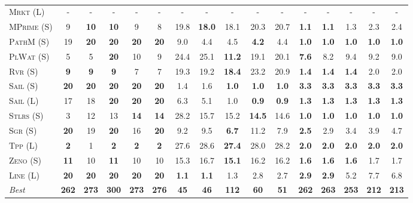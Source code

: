 \documentclass[11pt,landscape]{article}
\begin{document}
\begin{table*}[tb]
{\begin{tabular}{|l||ccccc||ccccc||ccccc||}
\textsc{Mrkt} (L)&-&-&-&-&-&-&-&-&-&-&-&-&-&-&-\\
\textsc{MPrime} (S)&9&\textbf{10}&\textbf{10}&9&8&19.8&\textbf{18.0}&18.1&20.3&20.7&\textbf{1.1}&\textbf{1.1}&1.3&2.3&2.4\\
\textsc{PathM} (S)&19&\textbf{20}&\textbf{20}&\textbf{20}&\textbf{20}&9.0&4.4&4.5&\textbf{4.2}&4.4&\textbf{1.0}&\textbf{1.0}&\textbf{1.0}&\textbf{1.0}&\textbf{1.0}\\
\textsc{PlWat} (S)&5&5&\textbf{20}&10&9&24.4&25.1&\textbf{11.2}&19.1&20.1&\textbf{7.6}&8.2&9.4&9.2&9.0\\
\textsc{Rvr} (S)&\textbf{9}&\textbf{9}&\textbf{9}&7&7&19.3&19.2&\textbf{18.4}&23.2&20.9&\textbf{1.4}&\textbf{1.4}&\textbf{1.4}&2.0&2.0\\
\textsc{Sail} (S)&\textbf{20}&\textbf{20}&\textbf{20}&\textbf{20}&\textbf{20}&1.4&1.6&\textbf{1.0}&\textbf{1.0}&\textbf{1.0}&\textbf{3.3}&\textbf{3.3}&\textbf{3.3}&\textbf{3.3}&\textbf{3.3}\\
\textsc{Sail} (L)&17&18&\textbf{20}&\textbf{20}&\textbf{20}&6.3&5.1&1.0&\textbf{0.9}&\textbf{0.9}&\textbf{1.3}&\textbf{1.3}&\textbf{1.3}&\textbf{1.3}&\textbf{1.3}\\
\textsc{Stlrs} (S)&3&12&13&\textbf{14}&\textbf{14}&28.2&15.7&15.2&\textbf{14.5}&14.6&\textbf{1.0}&\textbf{1.0}&\textbf{1.0}&\textbf{1.0}&\textbf{1.0}\\
\textsc{Sgr} (S)&\textbf{20}&19&\textbf{20}&16&\textbf{20}&9.2&9.5&\textbf{6.7}&11.2&7.9&\textbf{2.5}&2.9&3.4&3.9&4.7\\
\textsc{Tpp} (L)&\textbf{2}&1&\textbf{2}&\textbf{2}&\textbf{2}&27.6&28.6&\textbf{27.4}&28.0&28.2&\textbf{2.0}&\textbf{2.0}&\textbf{2.0}&\textbf{2.0}&\textbf{2.0}\\
\textsc{Zeno} (S)&\textbf{11}&10&\textbf{11}&10&10&15.3&16.7&\textbf{15.1}&16.2&16.2&\textbf{1.6}&\textbf{1.6}&\textbf{1.6}&1.7&1.7\\
\textsc{Line} (L)&\textbf{20}&\textbf{20}&\textbf{20}&\textbf{20}&\textbf{20}&\textbf{1.1}&\textbf{1.1}&1.3&2.8&2.7&\textbf{2.9}&\textbf{2.9}&5.2&7.7&6.8
\\\hline
\textit{Best}&\textbf{262}&\textbf{273}&\textbf{300}&\textbf{273}&\textbf{276}&\textbf{45}&\textbf{46}&\textbf{112}&\textbf{60}&\textbf{51}&\textbf{262}&\textbf{263}&\textbf{253}&\textbf{212}&\textbf{213}\\\hline

        \end{tabular}}
        \caption{}
        \label{tab:all-patty}
        \end{table*}
        
\end{document}
